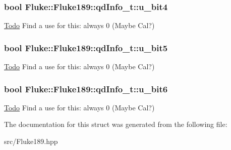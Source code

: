 \hypertarget{structFluke_1_1Fluke189_1_1qdInfo__t_a012174b29b7e6686a724204f63a09c91}{
\subsubsection[{u\_\-bit4}]{\setlength{\rightskip}{0pt plus 5cm}bool {\bf Fluke::Fluke189::qdInfo\_\-t::u\_\-bit4}}}
\label{structFluke_1_1Fluke189_1_1qdInfo__t_a012174b29b7e6686a724204f63a09c91}
\begin{Desc}
\item[\hyperlink{todo__todo000012}{Todo}]Find a use for this: always 0 (Maybe Cal?) \end{Desc}
\hypertarget{structFluke_1_1Fluke189_1_1qdInfo__t_ad123acd44f39185d0903250085834b72}{
\subsubsection[{u\_\-bit5}]{\setlength{\rightskip}{0pt plus 5cm}bool {\bf Fluke::Fluke189::qdInfo\_\-t::u\_\-bit5}}}
\label{structFluke_1_1Fluke189_1_1qdInfo__t_ad123acd44f39185d0903250085834b72}
\begin{Desc}
\item[\hyperlink{todo__todo000013}{Todo}]Find a use for this: always 0 (Maybe Cal?) \end{Desc}
\hypertarget{structFluke_1_1Fluke189_1_1qdInfo__t_a3a48f6b82d6abd8613a7f7f091c7ad16}{
\subsubsection[{u\_\-bit6}]{\setlength{\rightskip}{0pt plus 5cm}bool {\bf Fluke::Fluke189::qdInfo\_\-t::u\_\-bit6}}}
\label{structFluke_1_1Fluke189_1_1qdInfo__t_a3a48f6b82d6abd8613a7f7f091c7ad16}
\begin{Desc}
\item[\hyperlink{todo__todo000014}{Todo}]Find a use for this: always 0 (Maybe Cal?) \end{Desc}


The documentation for this struct was generated from the following file:\begin{DoxyCompactItemize}
\item 
src/Fluke189.hpp\end{DoxyCompactItemize}
